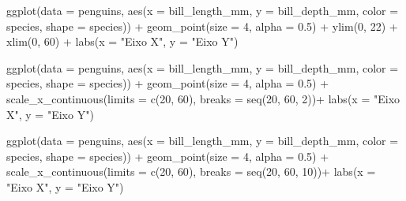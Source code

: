\documentclass[
]{book}
\newenvironment{Shaded}{\begin{snugshade}}{\end{snugshade}}
\newcommand{\AttributeTok}[1]{\textcolor[rgb]{0.61,0.61,0.61}{#1}}
\newcommand{\DecValTok}[1]{\textcolor[rgb]{0.06,0.06,0.06}{#1}}
\newcommand{\FloatTok}[1]{\textcolor[rgb]{0.06,0.06,0.06}{#1}}
\newcommand{\FunctionTok}[1]{\textcolor[rgb]{0,0,0}{#1}}
\newcommand{\NormalTok}[1]{#1}
\newcommand{\SpecialCharTok}[1]{\textcolor[rgb]{0,0,0}{#1}}
\newcommand{\StringTok}[1]{\textcolor[rgb]{0.5,0.5,0.5}{#1}}
\begin{document}
\begin{Shaded}
\begin{Highlighting}[]

\FunctionTok{ggplot}\NormalTok{(}\AttributeTok{data =}\NormalTok{ penguins, }
       \FunctionTok{aes}\NormalTok{(}\AttributeTok{x =}\NormalTok{ bill\_length\_mm, }
           \AttributeTok{y =}\NormalTok{ bill\_depth\_mm,}
           \AttributeTok{color =}\NormalTok{ species,}
           \AttributeTok{shape =}\NormalTok{ species)) }\SpecialCharTok{+}
  \FunctionTok{geom\_point}\NormalTok{(}\AttributeTok{size =} \DecValTok{4}\NormalTok{, }\AttributeTok{alpha =} \FloatTok{0.5}\NormalTok{) }\SpecialCharTok{+}
  \FunctionTok{ylim}\NormalTok{(}\DecValTok{0}\NormalTok{, }\DecValTok{22}\NormalTok{) }\SpecialCharTok{+}
  \FunctionTok{xlim}\NormalTok{(}\DecValTok{0}\NormalTok{, }\DecValTok{60}\NormalTok{) }\SpecialCharTok{+}
  \FunctionTok{labs}\NormalTok{(}\AttributeTok{x =} \StringTok{"Eixo X"}\NormalTok{, }\AttributeTok{y =} \StringTok{"Eixo Y"}\NormalTok{)}

\FunctionTok{ggplot}\NormalTok{(}\AttributeTok{data =}\NormalTok{ penguins, }
       \FunctionTok{aes}\NormalTok{(}\AttributeTok{x =}\NormalTok{ bill\_length\_mm, }
           \AttributeTok{y =}\NormalTok{ bill\_depth\_mm,}
           \AttributeTok{color =}\NormalTok{ species,}
           \AttributeTok{shape =}\NormalTok{ species)) }\SpecialCharTok{+}
  \FunctionTok{geom\_point}\NormalTok{(}\AttributeTok{size =} \DecValTok{4}\NormalTok{, }\AttributeTok{alpha =} \FloatTok{0.5}\NormalTok{) }\SpecialCharTok{+}
  \FunctionTok{scale\_x\_continuous}\NormalTok{(}\AttributeTok{limits =} \FunctionTok{c}\NormalTok{(}\DecValTok{20}\NormalTok{, }\DecValTok{60}\NormalTok{), }\AttributeTok{breaks =} \FunctionTok{seq}\NormalTok{(}\DecValTok{20}\NormalTok{, }\DecValTok{60}\NormalTok{, }\DecValTok{2}\NormalTok{))}\SpecialCharTok{+}
  \FunctionTok{labs}\NormalTok{(}\AttributeTok{x =} \StringTok{"Eixo X"}\NormalTok{, }\AttributeTok{y =} \StringTok{"Eixo Y"}\NormalTok{)}

\FunctionTok{ggplot}\NormalTok{(}\AttributeTok{data =}\NormalTok{ penguins, }
       \FunctionTok{aes}\NormalTok{(}\AttributeTok{x =}\NormalTok{ bill\_length\_mm, }
           \AttributeTok{y =}\NormalTok{ bill\_depth\_mm,}
           \AttributeTok{color =}\NormalTok{ species,}
           \AttributeTok{shape =}\NormalTok{ species)) }\SpecialCharTok{+}
  \FunctionTok{geom\_point}\NormalTok{(}\AttributeTok{size =} \DecValTok{4}\NormalTok{, }\AttributeTok{alpha =} \FloatTok{0.5}\NormalTok{) }\SpecialCharTok{+}
  \FunctionTok{scale\_x\_continuous}\NormalTok{(}\AttributeTok{limits =} \FunctionTok{c}\NormalTok{(}\DecValTok{20}\NormalTok{, }\DecValTok{60}\NormalTok{), }\AttributeTok{breaks =} \FunctionTok{seq}\NormalTok{(}\DecValTok{20}\NormalTok{, }\DecValTok{60}\NormalTok{, }\DecValTok{10}\NormalTok{))}\SpecialCharTok{+}
  \FunctionTok{labs}\NormalTok{(}\AttributeTok{x =} \StringTok{"Eixo X"}\NormalTok{, }\AttributeTok{y =} \StringTok{"Eixo Y"}\NormalTok{)}
\end{Highlighting}
\end{Shaded}
\end{document}
